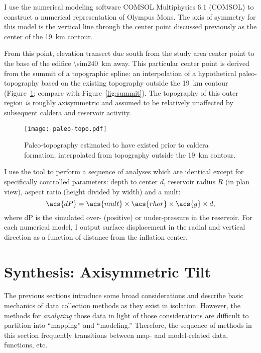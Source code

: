 I use the numerical modeling software COMSOL Multiphysics 6.1 (COMSOL) to construct a numerical representation of Olympus Mons. The axis of symmetry for this model is the vertical line through the center point discussed previously as the center of the \qty{19}{\km} contour.

From this point, elevation transect due south from the study area center point to the base of the edifice \qty{\sim240}{\km} away. This particular center point is derived from the summit of a topographic spline: an interpolation of a hypothetical paleo-topography based on the existing topography outside the \qty{19}{\km} contour (Figure~\ref{fig:paleo-topo}; compare with Figure~\ref{fig:summit}). The topography of this outer region \emph{is} roughly axisymmetric and assumed to be relatively unaffected by subsequent caldera and reservoir activity.

\begin{figure}
    \texttt{[image: paleo-topo.pdf]}
    \caption[Spline-derived paleo-topography]{Paleo-topography estimated to have existed prior to caldera formation; interpolated from topography outside the \qty{19}{\km} contour.}%
    \label{fig:paleo-topo}
\end{figure}

I use the  tool to perform a sequence of analyses which are identical except for specifically controlled parameters: depth to center $d$, reservoir radius $R$ (in plan view), aspect ratio (height divided by width) and a \ac{mult}:
\begin{equation}
    \acs{dP}=\acs{mult}\times\acs{rhor}\times\acs{g}\times d,
\end{equation}
where \acs{dP} is the simulated over- (positive) or under-pressure in the reservoir. For each numerical model, I output surface displacement in the radial and vertical direction as a function of distance from the inflation center. 

\section{Synthesis: Axisymmetric Tilt}\label{sec:synthesis}

The previous sections introduce some broad considerations and describe basic mechanics of data collection methods as they exist in isolation. However, the methods for \emph{analyzing} those data in light of those considerations are difficult to partition into ``mapping'' and ``modeling.'' Therefore, the sequence of methods in this section frequently transitions between map- and model-related data, functions, etc.

